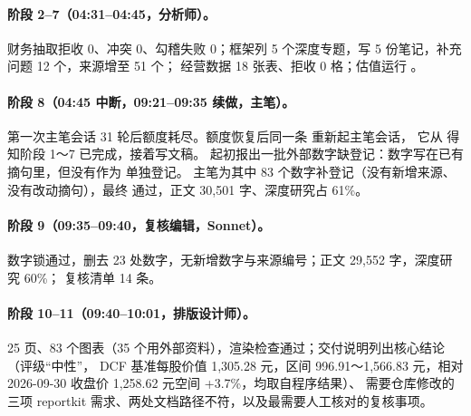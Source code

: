 \paragraph{阶段 2--7（04:31--04:45，分析师）。}财务抽取拒收 0、冲突 0、勾稽失败 0；框架列 5 个深度专题，写 5 份笔记，补充问题 12 个，来源增至 51 个；
经营数据 18 张表、拒收 0 格；估值运行 。

\paragraph{阶段 8（04:45 中断，09:21--09:35 续做，主笔）。}第一次主笔会话 31 轮后额度耗尽。额度恢复后同一条  重新起主笔会话，
它从  得知阶段 1～7 已完成，接着写文稿。 起初报出一批外部数字缺登记：数字写在已有摘句里，但没有作为  单独登记。
主笔为其中 83 个数字补登记（没有新增来源、没有改动摘句），最终  通过，正文 30,501 字、深度研究占 61\%。

\paragraph{阶段 9（09:35--09:40，复核编辑，Sonnet）。}数字锁通过，删去 23 处数字，无新增数字与来源编号；正文 29,552 字，深度研究 60\%；
复核清单 14 条。

\paragraph{阶段 10--11（09:40--10:01，排版设计师）。}25 页、83 个图表（35 个用外部资料），渲染检查通过；交付说明列出核心结论（评级“中性”，
DCF 基准每股价值 1,305.28 元，区间 996.91～1,566.83 元，相对 2026-09-30 收盘价 1,258.62 元空间 +3.7\%，均取自程序结果）、
需要仓库修改的三项 reportkit 需求、两处文档路径不符，以及最需要人工核对的复核事项。

